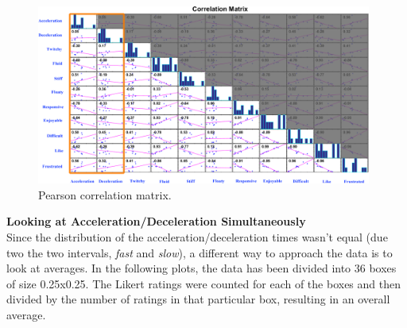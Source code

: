 




\begin{figure}[htbp]
\centering
\includegraphics[width=0.98\textwidth]{Pics/correlationMatrix_final}
\caption{Pearson correlation matrix.}
\label{fig:correlationMatrix}
\end{figure}

\textbf{Looking at Acceleration/Deceleration Simultaneously}\\
Since the distribution of the acceleration/deceleration times wasn't equal (due two the two intervals, \textit{fast} and \textit{slow}), a different way to approach the data is to look at averages. In the following plots, the data has been divided into 36 boxes of size 0.25x0.25. The Likert ratings were counted for each of the boxes and then divided by the number of ratings in that particular box, resulting in an overall average.

